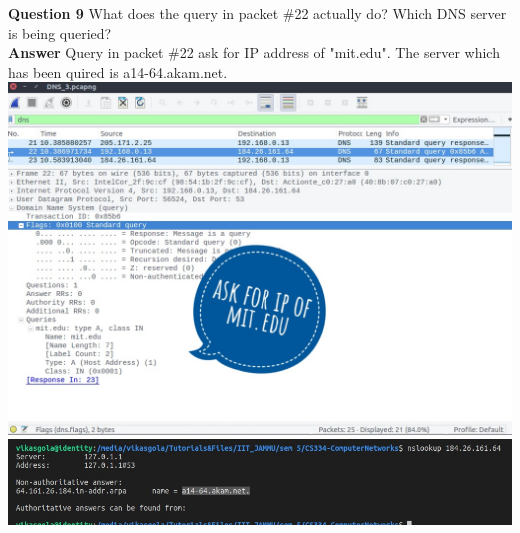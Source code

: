 \documentclass[14pt]{extarticle}
\begin{document}
    \noindent
    \textbf{\large Question 9}
    What does the query in packet \#22 actually do? Which DNS server is being queried?\\[10pt]
    \textbf{\large Answer}
    Query in packet \#22 ask for IP address of "mit.edu". The server which has been quired is a14-64.akam.net.\\[10pt]
    \includegraphics[scale=0.45]{3_9_1}\\[10pt]
    \includegraphics[scale=0.45]{3_9_2}\\[10pt]
    \vspace{1cm}
\end{document}
